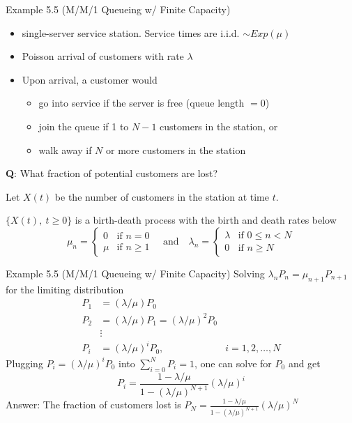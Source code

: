 \documentclass[letterpaper,handout]{beamer}
\begin{document}
\begin{frame}{Example 5.5 (M/M/1 Queueing w/ Finite Capacity)}
\begin{itemize}
\item single-server service station. Service times are i.i.d. $\sim Exp(\mu)$
\item Poisson arrival of customers with rate $\lambda$\pause
\item Upon arrival, a customer would
\begin{itemize}\normalsize
\item go into service if the server is free (queue length $=0$)
\item join the queue if 1 to $N-1$ customers in the station, or
\item \alert{walk away} if $N$ or more customers in the station
\end{itemize}\pause
\end{itemize}
{\bf Q}: What fraction of potential customers are lost?\par\pause\medskip

Let $X(t)$ be the number of customers in the station at time $t$. \smallskip

$\{X(t), ~t\ge 0\}$ is a birth-death process with the birth and death rates below
$$
\mu_n=
\begin{cases}
0   & \text{if }n = 0\\
\mu & \text{if }n\ge 1
\end{cases}\quad\text{and}\quad
\lambda_n =
\begin{cases}
\lambda&\text{if $0\le n<N$}\\
0& \text{if }n\ge N
\end{cases}
$$\end{frame}
\begin{frame}{Example 5.5 (M/M/1 Queueing w/ Finite Capacity)}
Solving $\lambda_n P_n= \mu_{n+1}P_{n+1}$ for the limiting distribution
\begin{align*}
P_1&=(\lambda/\mu)P_0\\
P_2&=(\lambda/\mu)P_1=(\lambda/\mu)^2P_0\\
&\vdots\\
P_i&=(\lambda/\mu)^iP_0, & i=1,2,\ldots,N
\end{align*}
Plugging $P_i=(\lambda/\mu)^iP_0$ into $\sum_{i=0}^N P_i=1$, one can solve for $P_0$ and get
$$
P_i=\frac{1-\lambda/\mu}{1-(\lambda/\mu)^{N+1}}(\lambda/\mu)^{i}
$$
Answer: The fraction of customers lost is $P_N=\frac{1-\lambda/\mu}{1-(\lambda/\mu)^{N+1}}(\lambda/\mu)^{N}$
\end{frame}
\end{document}
